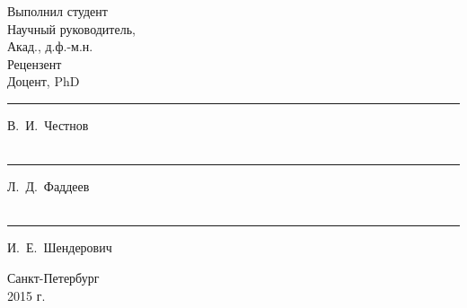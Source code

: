\begin{titlepage}
\begin{center}
\begin{flushleft}
\begin{minipage}[b]{0.5\textwidth}
\begin{flushleft}
	Выполнил студент\\[1cm]
	Научный руководитель,\\
	Акад., д.ф.-м.н.\\[1cm]
	Рецензент\\
	Доцент, PhD
\end{flushleft}
\end{minipage}
\begin{minipage}[b]{0.45\textwidth}
\begin{flushleft}
\rule{3cm}{0.5pt} В.~И.~Честнов\\[1cm]
\hfill\\
\rule{3cm}{0.5pt} Л.~Д.~Фаддеев\\[1cm]
\hfill\\
\rule{3cm}{0.5pt} И.~Е.~Шендерович
\end{flushleft}
\end{minipage}
\end{flushleft}
\vspace{1cm}

Санкт-Петербург\\
2015 г.

\end{center}
\end{titlepage}